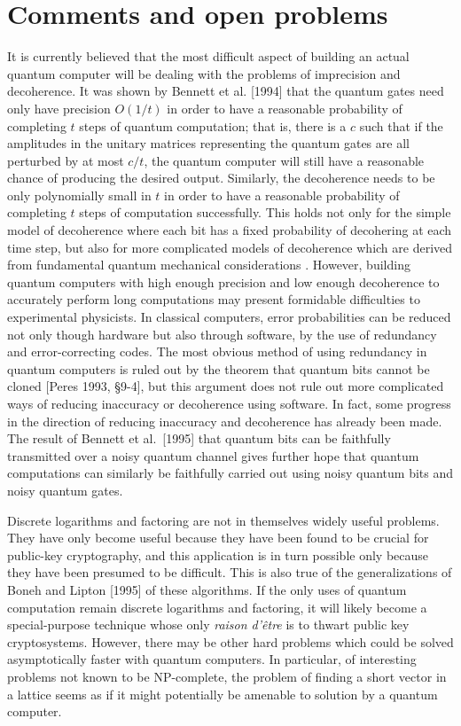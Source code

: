 \section{Comments and open problems}
It is currently believed that the most difficult aspect
of building an actual quantum computer will be dealing with the problems of 
imprecision and decoherence.  It was shown by Bennett et al.
[1994] that the quantum gates need only have precision
$O(1/t)$ in order to have a reasonable probability of completing $t$ steps 
of quantum computation; that is, there is a $c$ such that
if the amplitudes in the unitary matrices
representing the quantum gates are all perturbed by at most $c/t$, the 
quantum computer will still have a reasonable chance of producing the 
desired output.  Similarly, the decoherence needs to be only polynomially 
small in $t$ in order to have a reasonable probability of completing 
$t$ steps of computation successfully.  This holds not only for the simple 
model of decoherence where each bit has a fixed probability of
decohering at each time step, but also for more complicated models of
decoherence which are derived from fundamental quantum mechanical 
considerations \cite{Unru, PaSuEk, ChLaShZu}.  However, building
quantum computers with high enough precision and low enough decoherence
to accurately perform long computations may present formidable 
difficulties to experimental physicists.  In classical computers, error 
probabilities can be reduced not only though hardware but also through 
software, by the use of redundancy and error-correcting codes.   The most 
obvious method of using redundancy in quantum computers is ruled out by 
the theorem that quantum bits cannot be cloned [Peres 1993, \S\mbox{9-4}], 
but this argument does
not rule out more complicated ways of reducing inaccuracy or decoherence
using software.  In fact, some progress in the direction of reducing
inaccuracy \cite{BeDeJo} and decoherence \cite{Shor2}
has already been made.
The result of Bennett et al.\ [1995] that quantum bits can
be faithfully transmitted over a noisy quantum channel gives further
hope that quantum computations can similarly be faithfully carried out 
using noisy quantum bits and noisy quantum gates.

Discrete logarithms and factoring are not in themselves widely useful
problems.  They have only become useful because they have been
found to be crucial for public-key cryptography, and this application
is in turn possible only because they have been presumed to be difficult.
This is also true of the generalizations of Boneh and Lipton [1995] of
these algorithms.
If the only uses of quantum computation remain discrete logarithms and 
factoring, it will likely become a
special-purpose technique whose only {\em raison d'\^etre}
is to thwart public key cryptosystems.  However, there may be other 
hard problems which could be solved asymptotically faster with quantum 
computers.  In particular, of interesting problems not known
to be NP-complete, the problem of finding a short vector in a lattice 
\cite{Adle,AdMc} seems as if it might potentially be 
amenable to solution by a quantum computer.  

